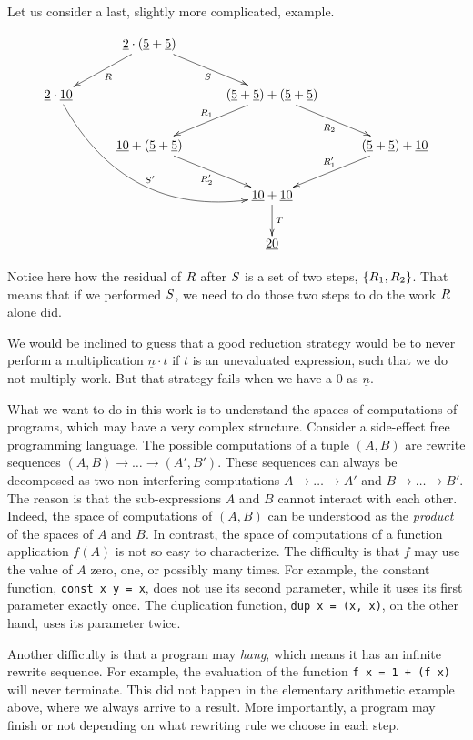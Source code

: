 Let us consider a last, slightly more complicated, example.

\[
\xymatrix@C=1cm{
  & \underline{2} \cdot (\underline{5} + \underline{5}) \ar[dl]^{\redex} \ar[dr]_{\redextwo} & & \\
\underline{2} \cdot \underline{10} \ar@/_3pc/[ddrr]^{\redextwo'} & & (\underline{5} + \underline{5}) + (\underline{5} + \underline{5}) \ar[dl]_{\redex_1} \ar[dr]_{\redex_2}& \\
  & \underline{10} + (\underline{5} + \underline{5}) \ar[dr]_{\redex_2'} & & (\underline{5} + \underline{5}) + \underline{10} \ar[dl]_{\redex_1'} \\
  & & \underline{10} + \underline{10} \ar[d]^{\redexthree}& \\
  & & \underline{20} &
}
\]

\noindent
Notice here how the residual of $R$ after $S$ is a set of two steps, $\{R_1, R_2\}$.
That means that if we performed $S$, we need to do those two steps to do the work $R$ alone did.

We would be inclined to guess that a good reduction strategy would be to never perform a
multiplication $\underline{n} \cdot t$ if $t$ is an unevaluated expression,
such that we do not multiply work. But that strategy fails when we have a 0 as $\underline{n}$.

\bigskip


What we want to do in this work is to understand the spaces of computations of programs,
which may have a very complex structure.
Consider a side-effect free programming language.
The possible computations of a tuple $(A,B)$
are rewrite sequences $(A,B) \to \hdots \to (A',B')$.
These sequences can always be decomposed as two non-interfering computations
$A \to \hdots \to A'$ and $B \to \hdots \to B'$.
The reason is that the sub-expressions $A$ and $B$ cannot interact with each other.
Indeed, the space of computations of $(A,B)$ can be understood as
the {\em product} of the spaces of $A$ and $B$.
In contrast, the space of computations of a function application $f(A)$ is not so easy
to characterize. The difficulty is that $f$ may use the value of $A$ zero, one, or
possibly many times.
For example, the constant function, \texttt{const x y = x}, does not use its second parameter,
while it uses its first parameter exactly once. The duplication function,
\texttt{dup x = (x, x)}, on the other hand, uses
its parameter twice.

Another difficulty is that a program may \emph{hang}, which means it has an infinite rewrite
sequence. For example, the evaluation of the function \texttt{f x = 1 + (f x)}
will never terminate.
This did not happen in the elementary arithmetic example above, where we always arrive to a result.
More importantly, a program may finish or not depending on what rewriting rule we choose in each step.


